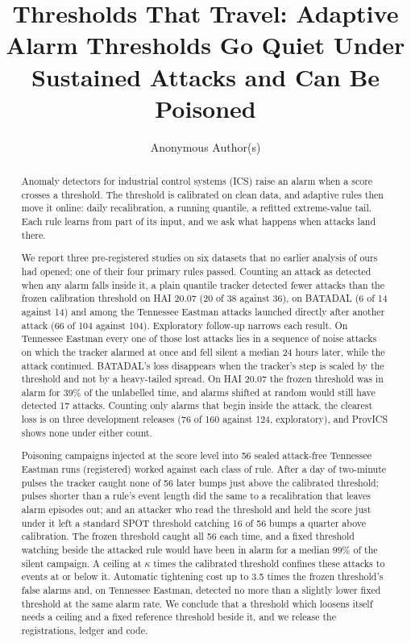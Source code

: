 \documentclass[sigconf,review,anonymous]{acmart}
\begin{document}
\title[Thresholds That Travel]{Thresholds That Travel: Adaptive Alarm Thresholds Go Quiet Under
  Sustained Attacks and Can Be Poisoned}

\author{Anonymous Author(s)}

\begin{abstract}
Anomaly detectors for industrial control systems (ICS) raise an alarm when a score crosses a
threshold. The threshold is calibrated on clean data, and adaptive rules then move it online: daily
recalibration, a running quantile, a refitted extreme-value tail. Each rule learns from part of its
input, and we ask what happens when attacks land there.

We report three pre-registered studies on six datasets that no earlier analysis of ours had opened;
one of their four primary rules passed. Counting an attack as detected when any alarm falls inside it,
a plain quantile tracker detected fewer attacks than the frozen calibration threshold on HAI 20.07 (20
of 38 against 36), on BATADAL (6 of 14 against 14) and among the Tennessee Eastman attacks launched
directly after another attack (66 of 104 against 104). Exploratory follow-up narrows each result. On
Tennessee Eastman every one of those lost attacks lies in a sequence of noise attacks on which the tracker alarmed
at once and fell silent a median 24 hours later, while the attack continued. BATADAL's loss disappears
when the tracker's step is scaled by the threshold and not by a heavy-tailed spread. On HAI 20.07 the
frozen threshold was in alarm for 39\% of the unlabelled time, and alarms shifted at random would still
have detected 17 attacks. Counting only alarms that begin inside the attack, the clearest loss is on
three development releases (76 of 160 against 124, exploratory), and ProvICS shows none under either
count.

Poisoning campaigns injected at the score level into 56 sealed attack-free Tennessee Eastman runs
(registered) worked against each class of rule. After a day of two-minute pulses the tracker caught
none of 56 later bumps just above the calibrated threshold; pulses shorter than a rule's event length
did the same to a recalibration that leaves alarm episodes out; and an attacker who read the threshold
and held the score just under it left a standard SPOT threshold catching 16 of 56 bumps a quarter above
calibration. The frozen threshold caught all 56 each time, and a fixed threshold watching beside the
attacked rule would have been in alarm for a median 99\% of the silent campaign. A ceiling at $\kappa$
times the calibrated threshold confines these attacks to events at or below it. Automatic tightening
cost up to 3.5 times the frozen threshold's false alarms and, on Tennessee Eastman, detected no more
than a slightly lower fixed threshold at the same alarm rate. We conclude that a threshold which
loosens itself needs a ceiling and a fixed reference threshold beside it, and we release the
registrations, ledger and code.
\end{abstract}
\end{document}
